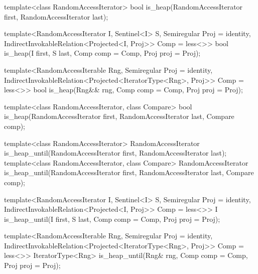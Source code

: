 %
\begin{removedblock}
\begin{itemdecl}
  template<class RandomAccessIterator>
    bool is_heap(RandomAccessIterator first, RandomAccessIterator last);
\end{itemdecl}
\end{removedblock}
\begin{addedblock}
\begin{itemdecl}
template<RandomAccessIterator I, Sentinel<I> S, Semiregular Proj = identity,
    IndirectInvokableRelation<Projected<I, Proj>> Comp = less<>>
  bool is_heap(I first, S last, Comp comp = Comp{}, Proj proj = Proj{});

template<RandomAccessIterable Rng, Semiregular Proj = identity,
    IndirectInvokableRelation<Projected<IteratorType<Rng>, Proj>> Comp = less<>>
  bool
    is_heap(Rng&& rng, Comp comp = Comp{}, Proj proj = Proj{});
\end{itemdecl}
\end{addedblock}

\begin{itemdescr}
\pnum
\returns {}
\end{itemdescr}

\begin{removedblock}
%
\begin{itemdecl}
  template<class RandomAccessIterator, class Compare>
    bool is_heap(RandomAccessIterator first, RandomAccessIterator last, Compare comp);
\end{itemdecl}

\begin{itemdescr}
\pnum
\returns {}
\end{itemdescr}
\end{removedblock}

%
\begin{removedblock}
\begin{itemdecl}
  template<class RandomAccessIterator>
    RandomAccessIterator is_heap_until(RandomAccessIterator first, RandomAccessIterator last);
  template<class RandomAccessIterator, class Compare>
    RandomAccessIterator is_heap_until(RandomAccessIterator first, RandomAccessIterator last,
      Compare comp);
\end{itemdecl}
\end{removedblock}
\begin{addedblock}
\begin{itemdecl}
template<RandomAccessIterator I, Sentinel<I> S, Semiregular Proj = identity,
    IndirectInvokableRelation<Projected<I, Proj>> Comp = less<>>
  I is_heap_until(I first, S last, Comp comp = Comp{}, Proj proj = Proj{});

template<RandomAccessIterable Rng, Semiregular Proj = identity,
    IndirectInvokableRelation<Projected<IteratorType<Rng>, Proj>> Comp = less<>>
  IteratorType<Rng>
    is_heap_until(Rng& rng, Comp comp = Comp{}, Proj proj = Proj{});
\end{itemdecl}
\end{addedblock}

